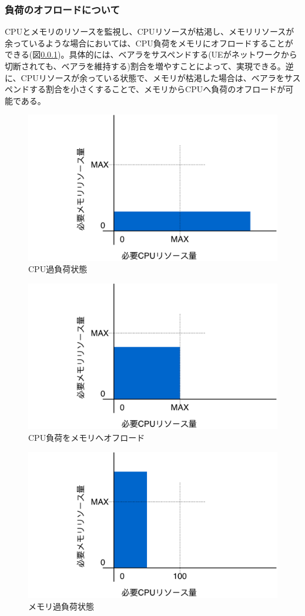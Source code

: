 \documentclass[a4j]{ujarticle}
\begin{document}
\subsubsection{負荷のオフロードについて}
CPUとメモリのリソースを監視し、CPUリソースが枯渇し、メモリリソースが余っているような場合においては、CPU負荷をメモリにオフロードすることができる(図\ref{})。具体的には、ベアラをサスペンドする(UEがネットワークから切断されても、ベアラを維持する)割合を増やすことによって、実現できる。逆に、CPUリソースが余っている状態で、メモリが枯渇した場合は、ベアラをサスペンドする割合を小さくすることで、メモリからCPUへ負荷のオフロードが可能である。
\begin{figure}[htbp]
	\centering
	\includegraphics[width=0.7\hsize]{overcpu.pdf}
  \caption{CPU過負荷状態}
	\label{overcpu}
\end{figure}

\begin{figure}[htbp]
	\centering
	\includegraphics[width=0.7\hsize]{okcpu.pdf}
  \caption{CPU負荷をメモリへオフロード}
	\label{okcpu}
\end{figure}

\begin{figure}[htbp]
	\centering
	\includegraphics[width=0.7\hsize]{overmemory.pdf}
  \caption{メモリ過負荷状態}
	\label{overmemory}
\end{figure}
\end{document}
